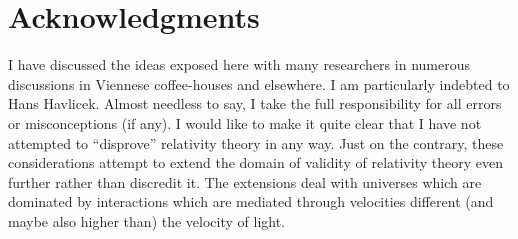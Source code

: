 \section*{Acknowledgments}

I have discussed the ideas exposed here with many researchers in
numerous discussions in Viennese coffee-houses and elsewhere.
I am particularly  indebted to Hans Havlicek.
Almost needless to say, I take the full responsibility
for all errors or misconceptions (if any).
I would like to make it quite clear
that I have not attempted to ``disprove'' relativity theory in
any way. Just on the contrary, these considerations
attempt to extend the domain of validity of relativity theory even
further rather than discredit it.
The extensions deal with universes which are dominated by interactions
which are mediated through velocities different (and maybe also higher
than) the velocity of light.
%
%
%

